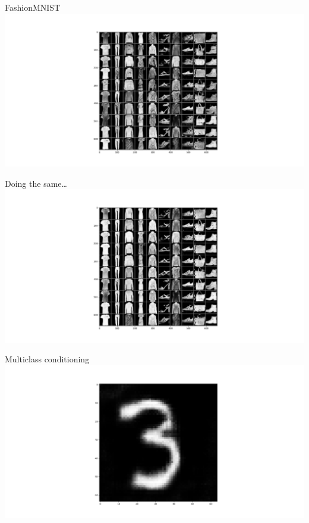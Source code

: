\documentclass{beamer}
\begin{document}
\begin{frame}{FashionMNIST}
    \centering
    \includegraphics[scale=0.2]{images/fashion.png}
\end{frame}

\begin{frame}{Doing the same\dots}
    \centering
    \includegraphics[scale=0.2]{images/fashion-weighted.png}
\end{frame}

\begin{frame}{Multiclass conditioning}
    \centering
    \includegraphics[scale=0.2]{images/gen3.png}
\end{frame}
\end{document}
